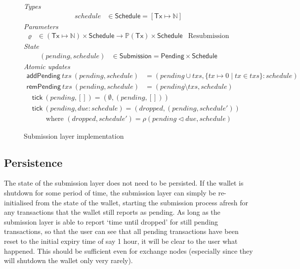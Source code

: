 \documentclass{article}
\newcommand{\restrictdom}{\lhd}
\numberwithin{equation}{lemma}
\begin{document}
\begin{figure}
%
\emph{Types}
%
\begin{align*}
  \mathit{schedule}
& \in \mathsf{Schedule} = [\mathsf{Tx} \mapsto \mathbb{N}]
\end{align*}
%
\emph{Parameters}
%
\begin{align*}
  \varrho
& \in (\mathsf{Tx} \mapsto \mathbb{N}) \times \mathsf{Schedule} \rightarrow \mathbb{P}(\mathsf{Tx}) \times \mathsf{Schedule} & \text{Resubmission}
\end{align*}
%
\emph{State}
%
\begin{align*}
  (\mathit{pending}, \mathit{schedule})
& \in \mathsf{Submission} = \mathsf{Pending} \times \mathsf{Schedule}
\end{align*}
%
\emph{Atomic updates}
%
\begin{align*}
  \mathsf{addPending}
    ~ \mathit{txs}
    ~ (\mathit{pending}, \mathit{schedule})
& = ( \mathit{pending} \cup \mathit{txs}
    , \{ \mathit{tx} \mapsto 0 \mid \mathit{tx} \in \mathit{txs} \} : \mathit{schedule}
    )
\\
  \mathsf{remPending}
    ~ \mathit{txs}
    ~ (\mathit{pending}, \mathit{schedule})
& = ( \mathit{pending} \setminus \mathit{txs}
    , \mathit{schedule}
    )
\end{align*}
\begin{align*}
& \mathsf{tick} ~ (\mathit{pending}, []) = (\emptyset, (\mathit{pending}, [])) \\
& \mathsf{tick} ~ (\mathit{pending}, \mathit{due} : \mathit{schedule})
= (\mathit{dropped}, (\mathit{pending}, \mathit{schedule'})) \\
& \qquad\text{where~} (\mathit{dropped}, \mathit{schedule}')
= \rho(\mathit{pending} \restrictdom \mathit{due}, \mathit{schedule})
\end{align*}
%
\caption{\label{fig:submission_layer_impl}Submission layer implementation}
\end{figure}

\subsection{Persistence}

The state of the submission layer does not need to be persisted. If the wallet
is shutdown for some period of time, the submission layer can simply be
re-initialised from the state of the wallet, starting the submission process
afresh for any transactions that the wallet still reports as pending. As long
as the submission layer is able to report `time until dropped' for still
pending transactions, so that the user can see that all pending transactions
have been reset to the initial expiry time of say 1 hour, it will be clear to
the user what happened. This should be sufficient even for exchange nodes
(especially since they will shutdown the wallet only very rarely).
\end{document}
